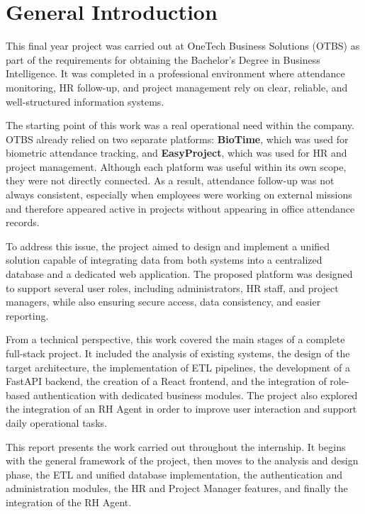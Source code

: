 \chapter*{General Introduction}
\mtcaddchapter

This final year project was carried out at OneTech Business Solutions (OTBS) as part of the requirements for obtaining the Bachelor's Degree in Business Intelligence. It was completed in a professional environment where attendance monitoring, HR follow-up, and project management rely on clear, reliable, and well-structured information systems.

The starting point of this work was a real operational need within the company. OTBS already relied on two separate platforms: \textbf{BioTime}, which was used for biometric attendance tracking, and \textbf{EasyProject}, which was used for HR and project management. Although each platform was useful within its own scope, they were not directly connected. As a result, attendance follow-up was not always consistent, especially when employees were working on external missions and therefore appeared active in projects without appearing in office attendance records.

To address this issue, the project aimed to design and implement a unified solution capable of integrating data from both systems into a centralized database and a dedicated web application. The proposed platform was designed to support several user roles, including administrators, HR staff, and project managers, while also ensuring secure access, data consistency, and easier reporting.

From a technical perspective, this work covered the main stages of a complete full-stack project. It included the analysis of existing systems, the design of the target architecture, the implementation of ETL pipelines, the development of a FastAPI backend, the creation of a React frontend, and the integration of role-based authentication with dedicated business modules. The project also explored the integration of an RH Agent in order to improve user interaction and support daily operational tasks.

This report presents the work carried out throughout the internship. It begins with the general framework of the project, then moves to the analysis and design phase, the ETL and unified database implementation, the authentication and administration modules, the HR and Project Manager features, and finally the integration of the RH Agent.